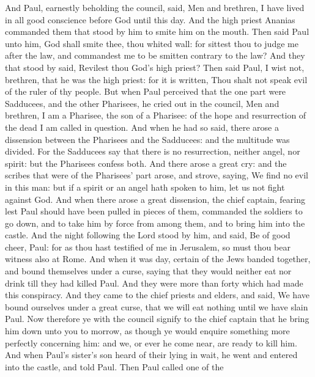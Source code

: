  And Paul, earnestly beholding the council, said, Men and
brethren, I have lived in all good conscience before God until this day.
 And the high priest Ananias commanded them that stood by
him to smite him on the mouth.  Then said Paul unto him, God
shall smite thee, thou whited wall: for sittest thou to judge me after
the law, and commandest me to be smitten contrary to the law?
 And they that stood by said, Revilest thou God's high
priest?  Then said Paul, I wist not, brethren, that he was
the high priest: for it is written, Thou shalt not speak evil of the
ruler of thy people.  But when Paul perceived that the one
part were Sadducees, and the other Pharisees, he cried out in the
council, Men and brethren, I am a Pharisee, the son of a Pharisee: of
the hope and resurrection of the dead I am called in question.
 And when he had so said, there arose a dissension between
the Pharisees and the Sadducees: and the multitude was divided.
 For the Sadducees say that there is no resurrection,
neither angel, nor spirit: but the Pharisees confess both. 
And there arose a great cry: and the scribes that were of the Pharisees'
part arose, and strove, saying, We find no evil in this man: but if a
spirit or an angel hath spoken to him, let us not fight against God.
 And when there arose a great dissension, the chief
captain, fearing lest Paul should have been pulled in pieces of them,
commanded the soldiers to go down, and to take him by force from among
them, and to bring him into the castle.  And the night
following the Lord stood by him, and said, Be of good cheer, Paul: for
as thou hast testified of me in Jerusalem, so must thou bear witness
also at Rome.  And when it was day, certain of the Jews
banded together, and bound themselves under a curse, saying that they
would neither eat nor drink till they had killed Paul.  And
they were more than forty which had made this conspiracy. 
And they came to the chief priests and elders, and said, We have bound
ourselves under a great curse, that we will eat nothing until we have
slain Paul.  Now therefore ye with the council signify to
the chief captain that he bring him down unto you to morrow, as though
ye would enquire something more perfectly concerning him: and we, or
ever he come near, are ready to kill him.  And when Paul's
sister's son heard of their lying in wait, he went and entered into the
castle, and told Paul.  Then Paul called one of the
